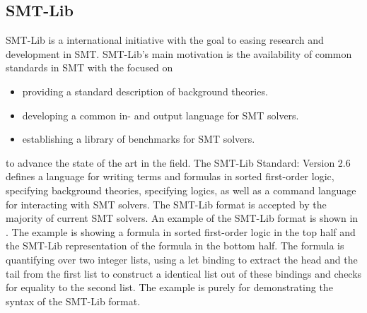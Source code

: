 \subsection{SMT-Lib}
SMT-Lib is a international initiative with the goal to easing
research and development in SMT.
SMT-Lib's main motivation is the availability of common standards in SMT
with the focused on
\begin{itemize}
    \item providing a standard description of background theories.
    \item developing a common in- and output language for SMT solvers.
    \item establishing a library of benchmarks for SMT solvers.
\end{itemize}
to advance the state of the art in the field.
The SMT-Lib Standard: Version 2.6~\cite{smtlib} defines a language for
writing terms and formulas in sorted first-order logic,
specifying background theories,
specifying logics,
as well as a command language for interacting with SMT solvers.
The SMT-Lib format is accepted by the majority of current SMT solvers.
An example of the SMT-Lib format is shown in . %
The example is showing a formula in sorted first-order logic in the top half
and the SMT-Lib representation of the formula in the bottom half.
The formula is quantifying over two integer lists,
using a let binding to extract the head and the tail from the first list
to construct a identical list out of these bindings and checks for equality to the second list.
The example is purely for demonstrating the syntax of the SMT-Lib format.


